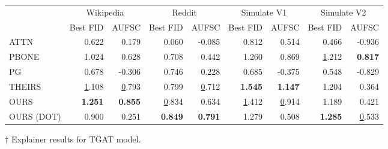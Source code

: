 \begin{tabular}{lrrrrrrrr}
\toprule
 & \multicolumn{2}{c}{Wikipedia} & \multicolumn{2}{c}{Reddit} & \multicolumn{2}{c}{Simulate V1} & \multicolumn{2}{c}{Simulate V2} \\
 & Best FID & AUFSC & Best FID & AUFSC & Best FID & AUFSC & Best FID & AUFSC \\
\midrule
ATTN & 0.622 & 0.179 & 0.060 & -0.085 & 0.812 & 0.514 & 0.466 & -0.936 \\
PBONE & 1.024 & 0.628 & 0.708 & 0.442 & 1.260 & 0.869 & \underline 1.212 & \bfseries 0.817 \\
PG & 0.678 & -0.306 & 0.746 & 0.228 & 0.685 & -0.375 & 0.548 & -0.829 \\
THEIRS & \underline 1.108 & \underline 0.793 & 0.799 & \underline 0.712 & \bfseries 1.545 & \bfseries 1.147 & 1.204 & 0.364 \\
OURS & \bfseries 1.251 & \bfseries 0.855 & \underline 0.834 & 0.634 & \underline 1.412 & \underline 0.914 & 1.189 & 0.421 \\
OURS (DOT) & 0.900 & 0.251 & \bfseries 0.849 & \bfseries 0.791 & 1.279 & 0.508 & \bfseries 1.285 & \underline 0.533 \\
\bottomrule
\end{tabular}
\caption{\label{tab:tgat_results}$\dagger$ Explainer results for TGAT model.}
